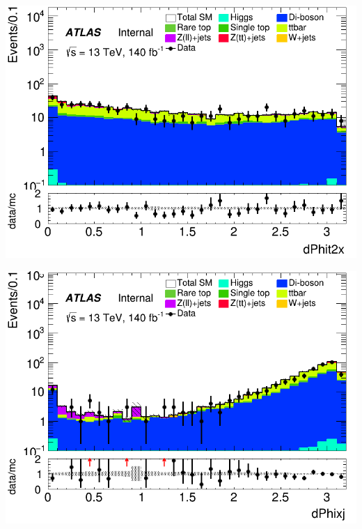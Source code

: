 \documentclass[usenames,dvipsnames]{beamer}
\begin{document}
\begin{frame}
    \begin{minipage}{0.32\textwidth}
        \centering
        \includegraphics[width=\textwidth]{graphics/LLH_met/LLH_met_dPhit2x.png}
    \end{minipage}
    \hfill
    \begin{minipage}{0.32\textwidth}
        \centering
        \includegraphics[width=\textwidth]{graphics/LLH_met/LLH_met_dPhixj.png}
    \end{minipage}
    \hfill
    \begin{minipage}{0.32\textwidth}
        \centering

\end{minipage}
\end{frame}
\end{document}
